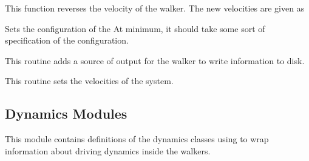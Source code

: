 \documentclass[letterpaper,10pt,english]{sphinxmanual}
\begin{document}
\begin{fulllineitems}
\begin{fulllineitems}
\end{fulllineitems}


\begin{fulllineitems}
\label{walker_api/walker_api.doc:walker_base.walker.reverseVel}
This function reverses the velocity of the walker. The new velocities are given as

\end{fulllineitems}


\begin{fulllineitems}
\label{walker_api/walker_api.doc:walker_base.walker.setConfig}
Sets the configuration of the At minimum, it should take some sort of specification of the configuration.

\end{fulllineitems}


\begin{fulllineitems}
\label{walker_api/walker_api.doc:walker_base.walker.setOutput}
This routine adds a source of output for the walker to write information to disk.

\end{fulllineitems}


\begin{fulllineitems}
\label{walker_api/walker_api.doc:walker_base.walker.setVel}
This routine sets the velocities of the system.

\end{fulllineitems}


\end{fulllineitems}



\subsection{Dynamics Modules}
\label{walker_api/walker_api.doc:module-dynamics}\label{walker_api/walker_api.doc:dynamics-modules}
This module contains definitions of the dynamics classes using to wrap information about driving dynamics inside the walkers.
\end{document}
